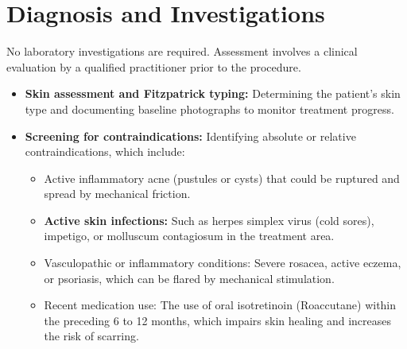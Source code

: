 \section*{Diagnosis and Investigations}
No laboratory investigations are required. Assessment involves a clinical evaluation by a qualified practitioner prior to the procedure.
\begin{itemize}
    \item \textbf{Skin assessment and Fitzpatrick typing:} Determining the patient's skin type and documenting baseline photographs to monitor treatment progress.
    \item \textbf{Screening for contraindications:} Identifying absolute or relative contraindications, which include:
        \begin{itemize}
            \item Active inflammatory acne (pustules or cysts) that could be ruptured and spread by mechanical friction.
            \item \textbf{Active skin infections:} Such as herpes simplex virus (cold sores), impetigo, or molluscum contagiosum in the treatment area.
            \item Vasculopathic or inflammatory conditions: Severe rosacea, active eczema, or psoriasis, which can be flared by mechanical stimulation.
            \item Recent medication use: The use of oral isotretinoin (Roaccutane) within the preceding 6 to 12 months, which impairs skin healing and increases the risk of scarring.
        \end{itemize}
\end{itemize}

